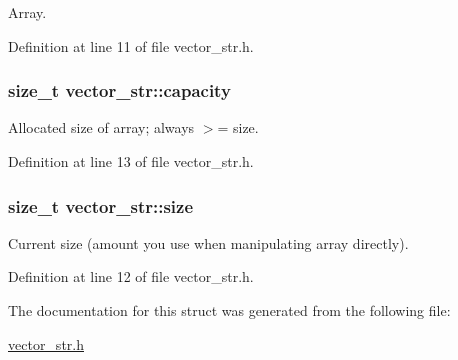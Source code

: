 Array. 



Definition at line 11 of file vector\-\_\-str.\-h.

\hypertarget{structvector__str_a8a52905a505acbcb9176be3eb6cf37f8}{
\subsubsection[{capacity}]{\setlength{\rightskip}{0pt plus 5cm}size\-\_\-t vector\-\_\-str\-::capacity}}\label{structvector__str_a8a52905a505acbcb9176be3eb6cf37f8}


Allocated size of array; always $>$= size. 



Definition at line 13 of file vector\-\_\-str.\-h.

\hypertarget{structvector__str_a63d4c1a5373481aa4ba9d4ee8252c748}{
\subsubsection[{size}]{\setlength{\rightskip}{0pt plus 5cm}size\-\_\-t vector\-\_\-str\-::size}}\label{structvector__str_a63d4c1a5373481aa4ba9d4ee8252c748}


Current size (amount you use when manipulating array directly). 



Definition at line 12 of file vector\-\_\-str.\-h.



The documentation for this struct was generated from the following file\-:\begin{DoxyCompactItemize}
\item 
\hyperlink{vector__str_8h}{vector\-\_\-str.\-h}\end{DoxyCompactItemize}
